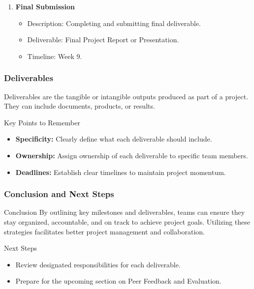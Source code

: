 \documentclass[aspectratio=169]{beamer}
\begin{document}
\begin{frame}[fragile]
\begin{enumerate}
        \item \textbf{Final Submission}
        \begin{itemize}
            \item Description: Completing and submitting final deliverable.
            \item Deliverable: Final Project Report or Presentation.
            \item Timeline: Week 9.
        \end{itemize}
    \end{enumerate}
\end{frame}

\begin{frame}[fragile]
    \frametitle{Deliverables}
    Deliverables are the tangible or intangible outputs produced as part of a project. They can include documents, products, or results.

    \begin{block}{Key Points to Remember}
        \begin{itemize}
            \item \textbf{Specificity:} Clearly define what each deliverable should include.
            \item \textbf{Ownership:} Assign ownership of each deliverable to specific team members.
            \item \textbf{Deadlines:} Establish clear timelines to maintain project momentum.
        \end{itemize}
    \end{block}
\end{frame}

\begin{frame}[fragile]
    \frametitle{Conclusion and Next Steps}
    \begin{block}{Conclusion}
        By outlining key milestones and deliverables, teams can ensure they stay organized, accountable, and on track to achieve project goals. 
        Utilizing these strategies facilitates better project management and collaboration.
    \end{block}

    \begin{block}{Next Steps}
        \begin{itemize}
            \item Review designated responsibilities for each deliverable.
            \item Prepare for the upcoming section on Peer Feedback and Evaluation.
        \end{itemize}
    \end{block}
\end{frame}
\end{document}
